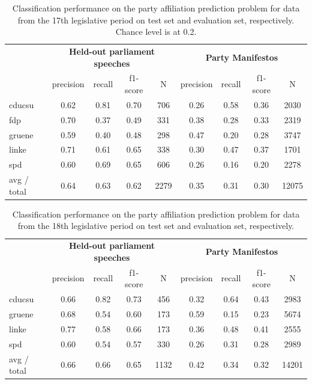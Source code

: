 \documentclass[runningheads,a4paper]{llncs}
\begin{document}
\begin{table}[t]
\begin{center}
\begin{tabular}{lcccccccc}
& \multicolumn{4}{c}{\bf Held-out parliament speeches} & \multicolumn{4}{c}{\bf Party Manifestos}\\
    &         precision    &recall &  f1-score  & N    &         precision    &recall &  f1-score  & N\\
\hline \hline
       cducsu   &    0.62  &    0.81  &    0.70  &     706&0.26    &  0.58   &   0.36    &  2030\\
        fdp    &   0.70   &   0.37  &    0.49    &   331&0.38   &   0.28    &  0.33   &   2319\\
     gruene &      0.59  &    0.40   &   0.48   &    298&0.47  &    0.20   &   0.28 &     3747\\
      linke    &   0.71   &   0.61  &    0.65    &   338&0.30   &   0.47   &   0.37    &  1701\\
        spd   &    0.60   &   0.69  &    0.65   &    606&0.26   &   0.16   &   0.20  &    2278\\
\hline
avg / total &      0.64   &   0.63   &   0.62    &  2279 &0.35    &  0.31 &     0.30   &  12075
%
\end{tabular}
\end{center}
\caption{
\label{tab:results_17}
Classification performance on the party affiliation prediction problem for data from the 17th legislative period on test set and evaluation set, respectively. Chance level is at 0.2.  
}
\end{table}

\begin{table}[t]
\begin{center}
\begin{tabular}{lcccccccc}
& \multicolumn{4}{c}{\bf Held-out parliament speeches} & \multicolumn{4}{c}{\bf Party Manifestos}\\
    &         precision    &recall &  f1-score  & N    &         precision    &recall &  f1-score  & N\\
\hline \hline
    cducsu    &   0.66   &   0.82   &   0.73    &   456 & 0.32  &    0.64  &    0.43    &  2983\\
     gruene   &    0.68    &  0.54   &   0.60    &   173   &0.59   &   0.15   &   0.23   &   5674\\
      linke     &  0.77  &    0.58    &  0.66    &   173 & 0.36   &   0.48   &   0.41   &   2555\\
        spd     &  0.60  &    0.54   &   0.57    &   330 & 0.26 &     0.31   &   0.28     & 2989\\
\hline
avg / total    &   0.66  &    0.66  &    0.65   &   1132&  0.42 &     0.34  &    0.32&     14201\\
%
\end{tabular}
\end{center}
\caption{
\label{tab:results_18}
Classification performance on the party affiliation prediction problem for data from the 18th legislative period on test set and evaluation set, respectively. 
}
\end{table}
\end{document}
